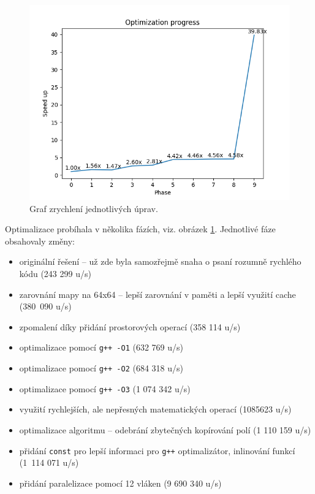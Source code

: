\documentclass[12pt]{article}
\begin{document}
\begin{figure}
    \centering
    \includegraphics[width=0.6\paperwidth,trim={0  0.2cm 0 0.8cm},clip]{optimization_progress.png}
    \caption{Graf zrychlení jednotlivých úprav.}
    \label{optim}
\end{figure}

\newpage
Optimalizace probíhala v několika fázích, viz. obrázek \ref{optim}. Jednotlivé fáze obsahovaly změny:
\begin{itemize}
    \item[0)] originální řešení -- už zde byla samozřejmě snaha o psaní rozumně rychlého kódu (243 299 u/s)
    \item[1)] zarovnání mapy na 64x64 -- lepší zarovnání v paměti a lepší využití cache (380~090 u/s)
    \item[2)] zpomalení díky přidání prostorových operací (358 114 u/s)
    \item[3)] optimalizace pomocí \texttt{g++ -O1} (632 769 u/s)
    \item[4)] optimalizace pomocí \texttt{g++ -O2} (684 318 u/s)
    \item[5)] optimalizace pomocí \texttt{g++ -O3} (1 074 342 u/s)
    \item[6)] využití rychlejších, ale nepřesných matematických operací (1085623 u/s)
    \item[7)] optimalizace algoritmu -- odebrání zbytečných kopírování polí (1 110 159 u/s)
    \item[8)] přidání \texttt{const} pro lepší informaci pro \texttt{g++} optimalizátor, inlinování funkcí (1~114 071 u/s)
    \item[9)] přidání paralelizace pomocí 12 vláken (9 690 340 u/s)
\end{itemize}
\end{document}
